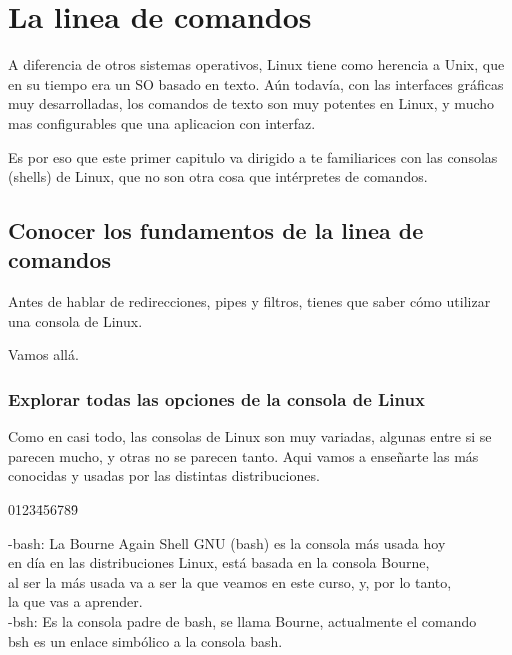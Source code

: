 \chapter{La linea de comandos}
\label{cha:Shell}


A diferencia de otros sistemas operativos, Linux tiene como herencia a Unix,
 que en su tiempo era un SO basado en texto.
Aún todavía, con las interfaces gráficas muy desarrolladas, los comandos de texto
son muy potentes en Linux, y mucho mas configurables que una aplicacion con interfaz.

Es por eso que este primer capitulo va dirigido a te familiarices con las consolas (shells)
de Linux, que no son otra cosa que intérpretes de comandos.


\section*{Conocer los fundamentos de la linea de comandos}

Antes de hablar de redirecciones, pipes y filtros, tienes que saber cómo utilizar una 
consola de Linux.

Vamos allá.

\subsection*{Explorar todas las opciones de la consola de Linux}

Como en casi todo, las consolas de Linux son muy variadas, algunas entre si se parecen mucho, 
y otras no se parecen tanto. Aqui vamos a enseñarte las más conocidas y usadas por las distintas 
distribuciones.

\begin{tabbing}
0123\=456\=789\=\kill		 	

\> -bash: La Bourne Again Shell GNU (bash) es la consola más usada hoy\\ 
\> en día en las distribuciones Linux, está basada en la consola Bourne, \\
\> al ser la más usada va a ser la que veamos en este curso, y, por lo tanto,\\
\> la que vas a aprender.\\

\> -bsh: Es la consola padre de bash, se llama Bourne, actualmente el comando\\
\> bsh es un enlace simbólico a la consola bash.\\



\end{tabbing}


